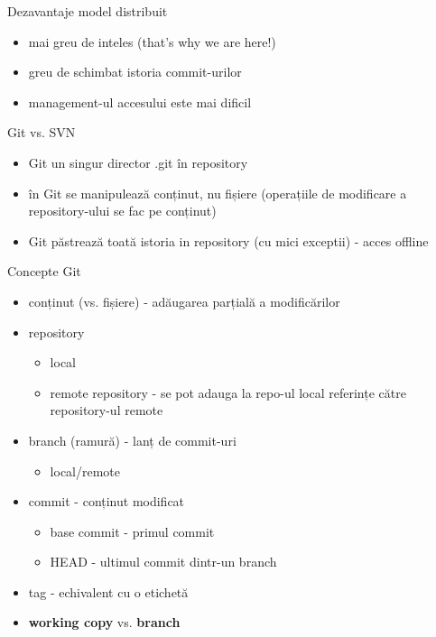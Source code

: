 \documentclass{beamer}
\begin{document}
\begin{frame}{Dezavantaje model distribuit}
\begin{itemize} %
\item mai greu de inteles (that's why we are here!)
\item greu de schimbat istoria commit-urilor
\item management-ul accesului este mai dificil
\end{itemize}
\end{frame}

\begin{frame}{Git vs. SVN}
\begin{itemize} %
\item Git un singur director .git în repository
\item în Git se manipulează conținut, nu fișiere (operațiile de modificare a repository-ului se fac pe conținut)
\item Git păstrează toată istoria in repository (cu mici exceptii) - acces offline
\end{itemize}
\end{frame}

\begin{frame}{Concepte Git}
\begin{itemize} %
\item conținut (vs. fișiere) - adăugarea parțială a modificărilor
\pause\item repository
\begin{itemize}
	\item local 
	\item remote repository - se pot adauga la repo-ul local referințe către repository-ul remote
\end{itemize}
\pause \item branch (ramură) - lanț de commit-uri
\begin{itemize}
	\item local/remote
\end{itemize}
\pause \item commit - conținut modificat
\begin{itemize}
	\item base commit - primul commit
	\item HEAD - ultimul commit dintr-un branch
\end{itemize}
\pause \item tag - echivalent cu o etichetă
\\
\pause \item \textbf{working copy} vs. \textbf{branch}
\end{itemize}
\end{frame}
\end{document}
